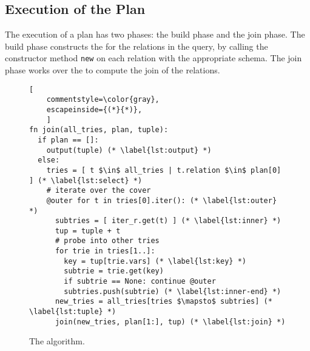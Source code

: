 



\subsection{Execution of the \FJ Plan}\label{sec:free-join-algorithm}


The execution of a \FJ plan has two phases: the build phase and the
join phase.  The build phase constructs the \GHTs for the relations in
the query, by calling the constructor method \lstinline|new| on each
relation with the appropriate schema.  The join phase works over the
\GHTs to compute the join of the relations.


\begin{figure}
  \begin{lstlisting}[
    commentstyle=\color{gray},
    escapeinside={(*}{*)},
    ]
fn join(all_tries, plan, tuple):
  if plan == []:
    output(tuple) (* \label{lst:output} *)
  else:
    tries = [ t $\in$ all_tries | t.relation $\in$ plan[0] ] (* \label{lst:select} *)
    # iterate over the cover
    @outer for t in tries[0].iter(): (* \label{lst:outer} *)
      subtries = [ iter_r.get(t) ] (* \label{lst:inner} *)
      tup = tuple + t
      # probe into other tries
      for trie in tries[1..]:     
        key = tup[trie.vars] (* \label{lst:key} *)
        subtrie = trie.get(key)
        if subtrie == None: continue @outer
        subtries.push(subtrie) (* \label{lst:inner-end} *)
      new_tries = all_tries[tries $\mapsto$ subtries] (* \label{lst:tuple} *)
      join(new_tries, plan[1:], tup) (* \label{lst:join} *)
\end{lstlisting}
  \caption{The \FJ algorithm.}
  \label{fig:fj-algo}
\end{figure}

